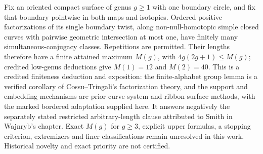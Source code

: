Fix an oriented compact surface of genus $g\geq1$ with one boundary circle, and fix that boundary pointwise in both maps and isotopies. Ordered positive factorizations of its single boundary twist, along non-null-homotopic simple closed curves with pairwise geometric intersection at most one, have finitely many simultaneous-conjugacy classes. Repetitions are permitted. Their lengths therefore have a finite attained maximum $M(g)$, with $4g(2g+1)\leq M(g)$; credited low-genus deductions give $M(1)=12$ and $M(2)=40$. This is a credited finiteness deduction and exposition: the finite-alphabet group lemma is a verified corollary of Cossu--Tringali's factorization theory, and the support and embedding mechanisms are prior curve-system and ribbon-surface methods, with the marked bordered adaptation supplied here. It answers negatively the separately stated restricted arbitrary-length clause attributed to Smith in Wajnryb's chapter. Exact $M(g)$ for $g\geq3$, explicit upper formulas, a stopping criterion, extremizers and finer classifications remain unresolved in this work. Historical novelty and exact priority are not certified.
